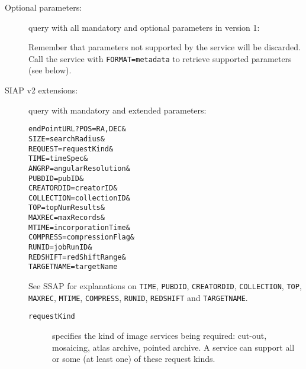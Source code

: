 	\begin{description}



		\item[Optional parameters:] query with all mandatory and 
		optional parameters in version 1:


		Remember that parameters not supported by the service 
		will be discarded. Call the service with 
		\texttt{FORMAT}\texttt{=}\texttt{metadata} to retrieve 
		supported parameters (see below).

% 

		\item[SIAP v2 extensions:] query with mandatory and extended 
		parameters:
		
		\texttt{endPointURL?POS=RA,DEC\&\\
				SIZE=searchRadius\&\\
				REQUEST=requestKind\&\\
				TIME=timeSpec\&\\
				ANGRP=angularResolution\&\\
				PUBDID=pubID\&\\
				CREATORDID=creatorID\&\\
				COLLECTION=collectionID\&\\
				TOP=topNumResults\&\\
				MAXREC=maxRecords\&\\
				MTIME=incorporationTime\&\\
				COMPRESS=compressionFlag\&\\
				RUNID=jobRunID\&\\
				REDSHIFT=redShiftRange\&\\
				TARGETNAME=targetName}
		
		See SSAP for explanations on 
		\texttt{TIME}, \texttt{PUBDID}, \texttt{CREATORDID}, 
		\texttt{COLLECTION}, \texttt{TOP}, \texttt{MAXREC}, 
		\texttt{MTIME}, \texttt{COMPRESS}, \texttt{RUNID}, 
		\texttt{REDSHIFT} and \texttt{TARGETNAME}.
		
		\begin{description}
			\item[\texttt{requestKind}] specifies the kind of image 
			services being required: cut-out, mosaicing, atlas 
			archive, pointed archive. A service can support all or 
			some (at least one) of these request kinds.
			

\end{description}
\end{description}
